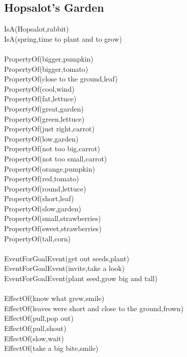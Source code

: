 \subsection{Hopsalot's Garden}

\begin{multicols}{2}
\begin{footnotesize}
\noindent
IsA(Hopsalot,rabbit) \\
IsA(spring,time to plant and to grow) \\
~\\
PropertyOf(bigger,pumpkin) \\
PropertyOf(bigger,tomato) \\
PropertyOf(close to the ground,leaf) \\
PropertyOf(cool,wind) \\
PropertyOf(fat,lettuce) \\
PropertyOf(great,garden) \\
PropertyOf(green,lettuce) \\
PropertyOf(just right,carrot) \\
PropertyOf(low,garden) \\
PropertyOf(not too big,carrot) \\
PropertyOf(not too small,carrot) \\
PropertyOf(orange,pumpkin) \\
PropertyOf(red,tomato) \\
PropertyOf(round,lettuce) \\
PropertyOf(short,leaf) \\
PropertyOf(slow,garden) \\
PropertyOf(small,strawberries) \\
PropertyOf(sweet,strawberries) \\
PropertyOf(tall,corn) \\
~\\
EventForGoalEvent(get out seeds,plant) \\
EventForGoalEvent(invite,take a look) \\
EventForGoalEvent(plant seed,grow big and tall) \\
~\\
EffectOf(know what grew,smile) \\
EffectOf(leaves were short and close to the ground,frown) \\
EffectOf(pull,pop out) \\
EffectOf(pull,shout) \\
EffectOf(slow,wait) \\
EffectOf(take a big bite,smile) \\

\end{footnotesize}
\end{multicols}
